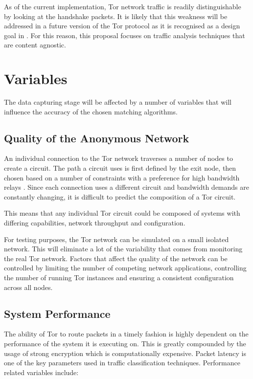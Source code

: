 \documentclass{ecuthesis}
\begin{document}
As of the current implementation, Tor network traffic is readily
distinguishable by looking at the handshake packets. It is likely that this
weakness will be addressed in a future version of the Tor protocol as it is
recognised as a design goal in \textcite{Dingledine:2008p1542}. For this
reason, this proposal focuses on traffic analysis techniques that are content
agnostic.

\section{Variables}

The data capturing stage will be affected by a number of variables that will
influence the accuracy of the chosen matching algorithms.

\subsection{Quality of the Anonymous Network}

An individual connection to the Tor network traverses a number of nodes to
create a circuit. The path a circuit uses is first defined by the exit node,
then chosen based on a number of constraints with a preference for high
bandwidth relays \parencite{website:tor-path-selection}. Since each connection
uses a different circuit and bandwidth demands are constantly changing, it is
difficult to predict the composition of a Tor circuit.

This means that any individual Tor circuit could be composed of systems with
differing capabilities, network throughput and configuration.

For testing purposes, the Tor network can be simulated on a small isolated
network. This will eliminate a lot of the variability that comes from
monitoring the real Tor network. Factors that affect the quality of the network
can be controlled by limiting the number of competing network applications,
controlling the number of running Tor instances and ensuring a consistent
configuration across all nodes.

\subsection{System Performance}

The ability of Tor to route packets in a timely fashion is highly dependent on
the performance of the system it is executing on. This is greatly compounded by
the usage of strong encryption which is computationally expensive. Packet
latency is one of the key parameters used in traffic classification techniques.
Performance related variables include:
\end{document}
